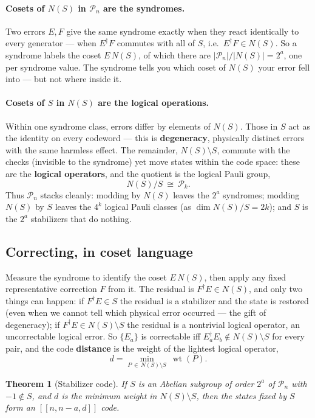 \documentclass[11pt]{article}
\newcommand{\wt}{\operatorname{wt}}
\theoremstyle{plain}
\newtheorem*{theorem*}{Theorem}
\begin{document}
\paragraph{Cosets of $N(S)$ in $\mathcal P_n$ are the syndromes.} Two errors $E,F$ give the same
syndrome exactly when they react identically to every generator --- when $E^\dagger F$ commutes with
all of $S$, i.e.\ $E^\dagger F\in N(S)$. So a syndrome labels the coset $E\,N(S)$, of which there are
$|\mathcal P_n|/|N(S)| = 2^{a}$, one per syndrome value. The syndrome tells you which coset of $N(S)$
your error fell into --- but not where inside it.

\paragraph{Cosets of $S$ in $N(S)$ are the logical operations.} Within one syndrome class, errors
differ by elements of $N(S)$. Those in $S$ act as the identity on every codeword --- this is
\textbf{degeneracy}, physically distinct errors with the same harmless effect. The remainder,
$N(S)\setminus S$, commute with the checks (invisible to the syndrome) yet move states within the code
space: these are the \textbf{logical operators}, and the quotient is the logical Pauli group,
\[ N(S)/S \ \cong\ \mathcal P_k. \]
Thus $\mathcal P_n$ stacks cleanly: modding by $N(S)$ leaves the $2^a$ syndromes; modding $N(S)$ by $S$
leaves the $4^k$ logical Pauli classes (as $\dim N(S)/S = 2k$); and $S$ is the $2^a$ stabilizers that
do nothing.

\subsection*{Correcting, in coset language}
Measure the syndrome to identify the coset $E\,N(S)$, then apply any fixed representative correction
$F$ from it. The residual is $F^\dagger E\in N(S)$, and only two things can happen: if
$F^\dagger E\in S$ the residual is a stabilizer and the state is restored (even when we cannot tell
which physical error occurred --- the gift of degeneracy); if $F^\dagger E\in N(S)\setminus S$ the
residual is a nontrivial logical operator, an uncorrectable logical error. So $\{E_a\}$ is correctable
iff $E_a^\dagger E_b\notin N(S)\setminus S$ for every pair, and the code \textbf{distance} is the
weight of the lightest logical operator,
\[ d = \min_{P\,\in\,N(S)\setminus S}\ \wt(P). \]

\begin{theorem*}[Stabilizer code]
If $S$ is an Abelian subgroup of order $2^a$ of $\mathcal P_n$ with $-1\notin S$, and $d$ is the
minimum weight in $N(S)\setminus S$, then the states fixed by $S$ form an $[[n,n-a,d]]$ code.
\end{theorem*}
\end{document}
